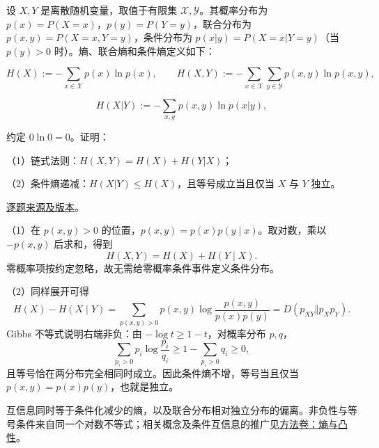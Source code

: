 \begin{example}[公开题解转录]\label{q:fin17-high:12}

设 $X,Y$ 是离散随机变量，取值于有限集 $\mathcal X,\mathcal Y$。其概率分布为 $p(x)=P(X=x)$，$p(y)=P(Y=y)$，联合分布为 $p(x,y)=P(X=x,Y=y)$，条件分布为 $p(x|y)=P(X=x|Y=y)$（当 $p(y)>0$ 时）。熵、联合熵和条件熵定义如下：

\[
H(X):=-\sum_{x\in\mathcal X}p(x)\ln p(x),\qquad
H(X,Y):=-\sum_{x\in\mathcal X}\sum_{y\in\mathcal Y}p(x,y)\ln p(x,y),
\]

\[
H(X|Y):=-\sum_{x,y}p(x,y)\ln p(x|y),
\]

约定 $0\ln0=0$。证明：

（1）链式法则：$H(X,Y)=H(X)+H(Y|X)$；

（2）条件熵递减：$H(X|Y)\le H(X)$，且等号成立当且仅当 $X$ 与 $Y$ 独立。

\end{example}

\href{https://github.com/lzxcr/cmc-mathematics/blob/64916fa1fdbc3e444a652eca204d5669058ee321/src/problems/finals/17/15.md}{逐题来源及版本}。

\begin{solve}

（1）在 $p(x,y)>0$ 的位置，$p(x,y)=p(x)p(y\mid x)$。取对数，乘以 $-p(x,y)$ 后求和，得到
\[
H(X,Y)=H(X)+H(Y\mid X).
\]
零概率项按约定忽略，故无需给零概率条件事件定义条件分布。

（2）同样展开可得
\[
H(X)-H(X\mid Y)
=\sum_{p(x,y)>0}p(x,y)\log\frac{p(x,y)}{p(x)p(y)}
=D(p_{XY}\Vert p_Xp_Y).
\]
Gibbs 不等式说明右端非负：由 $-\log t\ge1-t$，对概率分布 $p,q$，
\[
\sum_{p_i>0}p_i\log\frac{p_i}{q_i}
\ge1-\sum_{p_i>0}q_i\ge0,
\]
且等号恰在两分布完全相同时成立。因此条件熵不增，等号当且仅当 $p(x,y)=p(x)p(y)$，也就是独立。

\end{solve}

\begin{remark}[方法与条件]

互信息同时等于条件化减少的熵，以及联合分布相对独立分布的偏离。非负性与等号条件来自同一个对数不等式；相关概念及条件互信息的推广见\hyperref[app:probability-entropy]{方法卷：熵与凸性}。

\end{remark}





